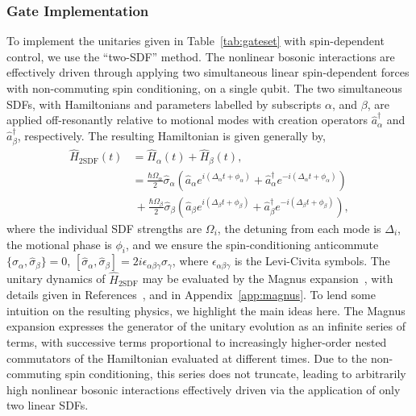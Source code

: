     \subsubsection{Gate Implementation}
    \label{sec:two-sdf}
    To implement the unitaries given in Table~\ref{tab:gateset} with spin-dependent control, 
    we use the ``two-SDF'' method. The nonlinear bosonic interactions are effectively driven through applying two simultaneous linear spin-dependent forces with non-commuting spin conditioning, on a single qubit. 
    The two simultaneous SDFs, with Hamiltonians and parameters labelled by subscripts $\alpha$, and $\beta$, are applied off-resonantly relative to motional modes with creation operators $\hat a_\alpha^\dagger$ and $\hat a_\beta^\dagger$, respectively. The resulting Hamiltonian is given generally by,
    \begin{subequations}
    \label{eqn:two-sdf}
    \begin{align}
      \hat H_\mathrm{2SDF}(t)  &= \hat H_\alpha(t) + \hat H_\beta(t),\\
      &=
      \frac{\hbar \Omega_\alpha}{2}\hat\sigma_\alpha \left(\hat a_\alpha e^{i(\Delta_\alpha t + \phi_\alpha)} + \hat a_\alpha^\dagger e^{-i(\Delta _\alpha t + \phi_\alpha )}\right)\nonumber\\
      &~+ 
      \frac{\hbar \Omega_{\beta}}{2}\hat\sigma_{\beta} \left(\hat a_\beta e^{i(\Delta_\beta t + \phi_\beta)} + \hat a_\beta^\dagger e^{-i(\Delta_\beta t + \phi_\beta)}\right),
    \end{align}
    \end{subequations}
    where the individual SDF strengths are $\Omega_i$, the detuning from each mode is $\Delta_i$, the motional phase is $\phi_i$, and we ensure the spin-conditioning anticommute $\{\hat\sigma_\alpha, \hat\sigma_\beta\} = 0$, $[\hat\sigma_\alpha, \hat\sigma_\beta] = 2i\epsilon_{\alpha\beta\gamma}\hat\sigma_\gamma$,
    where $\epsilon_{\alpha\beta\gamma}$ is the Levi-Civita symbols.
    The unitary dynamics of $\hat H_\mathrm{2SDF}$ may be evaluated by the Magnus expansion~\cite{magnus_exponential_1954}, with details given in References~\cite{sutherland_universal_2021,bazavan_easy_2024,saner_quantum_2026}, and in Appendix~\ref{app:magnus}. 
    To lend some intuition on the resulting physics, we highlight the main ideas here. The Magnus expansion expresses the generator of the unitary evolution as an infinite series of terms, with successive terms proportional to increasingly higher-order nested commutators of the Hamiltonian evaluated at different times. Due to the non-commuting spin conditioning, this series does not truncate, leading to arbitrarily high nonlinear bosonic interactions effectively driven via the application of only two linear SDFs.

